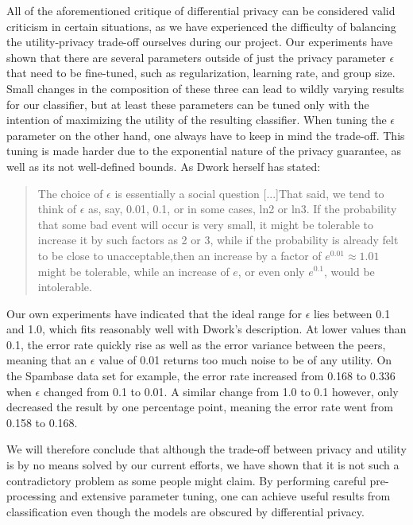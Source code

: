 All of the aforementioned critique of differential privacy can be considered valid criticism in certain situations, as we have experienced the difficulty of balancing the utility-privacy trade-off ourselves during our project. Our experiments have shown that there are several parameters outside of just the privacy parameter $\epsilon$ that need to be fine-tuned, such as regularization, learning rate, and group size. Small changes in the composition of these three can lead to wildly varying results for our classifier, but at least these parameters can be tuned only with the intention of maximizing the utility of the resulting classifier. When tuning the $\epsilon$ parameter on the other hand, one always have to keep in mind the trade-off. This tuning is made harder due to the exponential nature of the privacy guarantee, as well as its not well-defined bounds. As Dwork herself has stated\citep{dwork2008differential}: 
\begin{quote}
	The choice of $\epsilon$ is essentially a social question [...]That said, we tend to think of $\epsilon$ as, say, 0.01, 0.1, or in some cases, ln2 or ln3. If the probability that some bad event will occur is very small, it might be tolerable to increase it by such factors as 2 or 3, while if the probability is already felt to be close to unacceptable,then an increase by a factor of $e^{0.01} \approx 1.01$ might be tolerable, 	while an increase of $e$, or even only $e^{0.1}$, would be intolerable.
\end{quote}

Our own experiments have indicated that the ideal range for $\epsilon$ lies between 0.1 and 1.0, which fits reasonably well with Dwork's description. At lower values than 0.1, the error rate quickly rise as well as the error variance between the peers, meaning that an $\epsilon$ value of 0.01 returns too much noise to be of any utility. On the Spambase data set for example, the error rate increased from 0.168 to 0.336 when $\epsilon$ changed from 0.1 to 0.01. A similar change from 1.0 to 0.1 however, only decreased the result by one percentage point, meaning the error rate went from 0.158 to 0.168.     

We will therefore conclude that although the trade-off between privacy and utility is by no means solved by our current efforts, we have shown that it is not such a contradictory problem as some people might claim. By performing careful pre-processing and extensive parameter tuning, one can achieve useful results from classification even though the models are obscured by differential privacy.   


